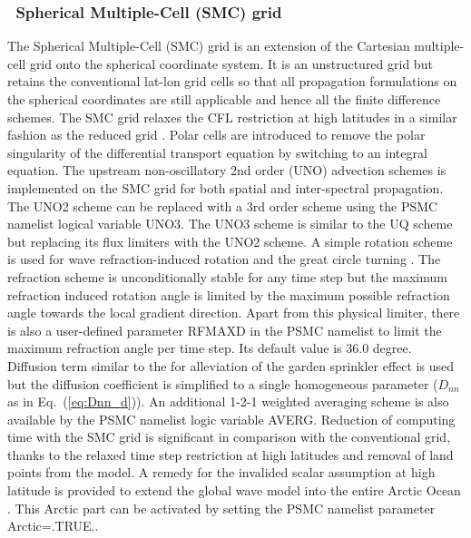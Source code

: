 \vssub
\subsubsection{~Spherical Multiple-Cell (SMC) grid} \label{sub:num_space_SMC}

\noindent
The Spherical Multiple-Cell (SMC) grid \citep{art:Li11} is an extension of the 
Cartesian multiple-cell grid \citep{art:Li03} onto the spherical coordinate 
system. It is an unstructured grid but retains the conventional lat-lon grid 
cells so that all propagation formulations on the spherical coordinates are 
still applicable and hence all the finite difference schemes. The SMC grid 
relaxes the CFL restriction at high latitudes in a similar fashion as the 
reduced grid \citep{art:RA94}. Polar cells are introduced to remove the polar 
singularity of the differential transport equation by switching to an integral
equation. The upstream non-oscillatory 2nd order (UNO) advection schemes
\citep{art:Li08} is implemented on the SMC grid for both spatial and
inter-spectral propagation. The UNO2 scheme can be replaced with a 3rd order 
scheme using the {\F PSMC} namelist logical variable {\code UNO3}.  The UNO3 
scheme is similar to the UQ scheme but replacing its flux limiters with the 
UNO2 scheme.  A simple rotation scheme is used for wave refraction-induced 
rotation and the great circle turning \citep{art:Li12}.  The refraction scheme 
is unconditionally stable for any time step but the maximum refraction induced 
rotation angle is limited by the maximum possible refraction angle towards the 
local gradient direction.  Apart from this physical limiter, there is also a 
user-defined parameter {\code RFMAXD} in the {\F PSMC} namelist to limit the 
maximum refraction angle per time step.  Its default value is 36.0 degree.
Diffusion term similar to the \cite{art:BH87} for alleviation of the garden 
sprinkler effect is used but the diffusion coefficient is simplified to a 
single homogeneous parameter ($D_{nn}$ as in Eq.~(\ref{eq:Dnn_d})).  An 
additional 1-2-1 weighted averaging scheme is also available by the {\F PSMC} 
namelist logic variable {\code AVERG}.  Reduction of computing time with the 
SMC grid is significant in comparison with the conventional grid, thanks to the 
relaxed time step restriction at high latitudes and removal of land points from 
the model.  A remedy for the invalided scalar assumption at high latitude is 
provided to extend the global wave model into the entire Arctic Ocean 
\citep{art:Li16}.  This Arctic part can be activated by setting the {\F PSMC}
namelist parameter {\code Arctic=.TRUE.}.

